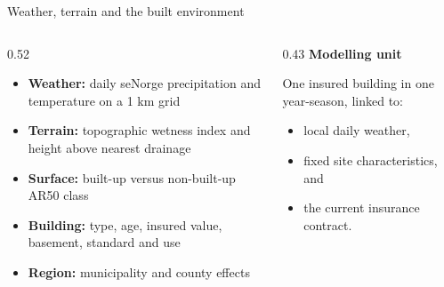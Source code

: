 \begin{frame}{Weather, terrain and the built environment}
  \begin{columns}[T,onlytextwidth]
    \begin{column}{0.52\textwidth}
      \begin{itemize}
        \item \textbf{Weather:} daily seNorge precipitation and
          temperature on a 1 km grid
        \item \textbf{Terrain:} topographic wetness index and height
          above nearest drainage
        \item \textbf{Surface:} built-up versus non-built-up AR50 class
        \item \textbf{Building:} type, age, insured value, basement,
          standard and use
        \item \textbf{Region:} municipality and county effects
      \end{itemize}
    \end{column}
    \begin{column}{0.43\textwidth}
      \textbf{Modelling unit}

      One insured building in one year-season, linked to:
      \begin{itemize}
        \item local daily weather,
        \item fixed site characteristics, and
        \item the current insurance contract.
      \end{itemize}
    \end{column}
  \end{columns}
\end{frame}

